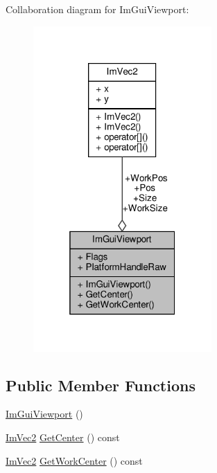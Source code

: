 Collaboration diagram for Im\+Gui\+Viewport\+:
\nopagebreak
\begin{figure}[H]
\begin{center}
\leavevmode
\includegraphics[width=193pt]{structImGuiViewport__coll__graph}
\end{center}
\end{figure}
\subsection*{Public Member Functions}
\begin{DoxyCompactItemize}
\item 
\hyperlink{structImGuiViewport_aa195d9a5b7ba8905c5064195a059868c}{Im\+Gui\+Viewport} ()
\item 
\hyperlink{structImVec2}{Im\+Vec2} \hyperlink{structImGuiViewport_aecb8b050853aae709f64b82319699bf8}{Get\+Center} () const
\item 
\hyperlink{structImVec2}{Im\+Vec2} \hyperlink{structImGuiViewport_a64a278e84f98efbf67fe0d46b29f686a}{Get\+Work\+Center} () const
\end{DoxyCompactItemize}
